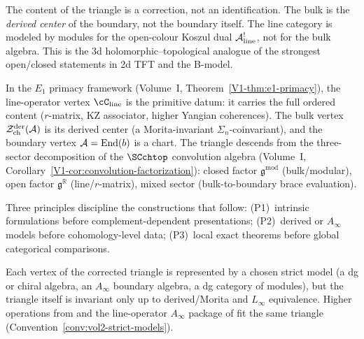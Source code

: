 The content of the triangle is a correction, not an identification.
The bulk is the \emph{derived center} of the boundary, not the
boundary itself. The line category is modeled by modules for the
open-colour Koszul dual $\mathcal{A}^!_{\mathrm{line}}$, not for the bulk algebra.
This is the 3d holomorphic--topological analogue of the strongest
open/closed statements in 2d TFT and the B-model.

In the $E_1$ primacy framework
(Volume~I, Theorem~\ref*{V1-thm:e1-primacy}), the line-operator
vertex $\cC_{\mathrm{line}}$ is the primitive datum: it carries the
full ordered content ($r$-matrix, KZ associator, higher Yangian
coherences). The bulk vertex
$\mathcal{Z}^{\mathrm{der}}_{\mathrm{ch}}(\mathcal{A})$ is its derived center (a
Morita-invariant $\Sigma_n$-coinvariant), and the boundary vertex
$\mathcal{A} = \mathrm{End}(b)$ is a chart. The triangle descends from the
three-sector decomposition of the $\SCchtop$ convolution algebra
(Volume~I, Corollary~\ref*{V1-cor:convolution-factorization}):
closed factor $\mathfrak{g}^{\mathrm{mod}}$ (bulk/modular), open
factor $\mathfrak{g}^{\mathbb{R}}$ (line/$r$-matrix), mixed sector
(bulk-to-boundary brace evaluation).

Three principles discipline the constructions that follow:
(P1)~intrinsic formulations before complement-dependent
presentations; (P2)~derived or $A_\infty$ models before
cohomology-level data; (P3)~local exact theorems before global
categorical comparisons.

\begin{remark}
\label{rem:bbl-e1-primacy}
\label{rem:triangle-homotopy-first}
Each vertex of the corrected triangle is represented by a chosen
strict model (a dg or chiral algebra, an $A_\infty$ boundary
algebra, a dg category of modules), but the triangle itself is
invariant only up to derived/Morita and $L_\infty$ equivalence.
Higher operations from \cite{GKW25} and the line-operator
$A_\infty$ package of \cite{DNP25} fit the same triangle
(Convention~\ref{conv:vol2-strict-models}).
\end{remark}


